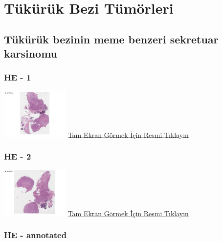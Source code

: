 \documentclass[
  letterpaper,
  DIV=11,
  numbers=noendperiod]{scrreprt}
\begin{document}
\hypertarget{sec-tukuruk-bezi-tumorleri}{%
\chapter{Tükürük Bezi Tümörleri}\label{sec-tukuruk-bezi-tumorleri}}

\hypertarget{tuxfckuxfcruxfck-bezinin-meme-benzeri-sekretuar-karsinomu}{%
\section{Tükürük bezinin meme benzeri sekretuar
karsinomu}\label{tuxfckuxfcruxfck-bezinin-meme-benzeri-sekretuar-karsinomu}}

\hypertarget{he---1-3}{%
\subsection{HE - 1}\label{he---1-3}}

\href{https://images.patolojiatlasi.com/mammary-analogue-secretory-carcinoma/HE1.html}{\includegraphics[width=0.25\textwidth,height=\textheight]{./screenshots/mammary-analogue-secretory-carcinoma1_screenshot.png}}
\href{https://images.patolojiatlasi.com/mammary-analogue-secretory-carcinoma/HE1.html}{Tam
Ekran Görmek İçin Resmi Tıklayın}

\hypertarget{he---2-3}{%
\subsection{HE - 2}\label{he---2-3}}

\href{https://images.patolojiatlasi.com/mammary-analogue-secretory-carcinoma/HE2.html}{\includegraphics[width=0.25\textwidth,height=\textheight]{./screenshots/mammary-analogue-secretory-carcinoma2_screenshot.png}}
\href{https://images.patolojiatlasi.com/mammary-analogue-secretory-carcinoma/HE2.html}{Tam
Ekran Görmek İçin Resmi Tıklayın}

\hypertarget{he---annotated-2}{%
\subsection{HE - annotated}\label{he---annotated-2}}
\end{document}

